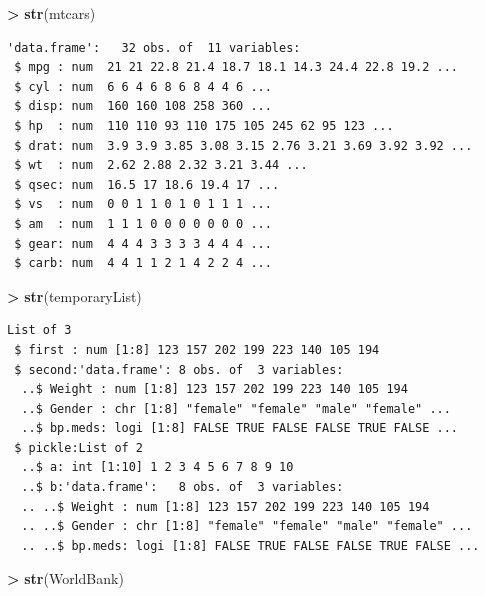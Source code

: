\documentclass[]{krantz}
\makeatletter
\newenvironment{Shaded}{\begin{snugshade}}{\end{snugshade}}
\newcommand{\KeywordTok}[1]{\textcolor[rgb]{0.27,0.27,0.27}{\textbf{#1}}}
\newcommand{\NormalTok}[1]{#1}
\newcommand{\OperatorTok}[1]{\textcolor[rgb]{0.43,0.43,0.43}{\textbf{#1}}}
\newcommand{\StringTok}[1]{\textcolor[rgb]{0.5,0.5,0.5}{#1}}
\newenvironment{kframe}{%
\medskip{}
\setlength{\fboxsep}{.8em}
 \def\at@end@of@kframe{}%
 \ifinner\ifhmode%
  \def\at@end@of@kframe{\end{minipage}}%
  \begin{minipage}{\columnwidth}%
 \fi\fi%
 \def\FrameCommand##1{\hskip\@totalleftmargin \hskip-\fboxsep
 \colorbox{shadecolor}{##1}\hskip-\fboxsep
     \hskip-\linewidth \hskip-\@totalleftmargin \hskip\columnwidth}%
 \MakeFramed {\advance\hsize-\width
   \@totalleftmargin\z@ \linewidth\hsize
   \@setminipage}}%
 {\par\unskip\endMakeFramed%
 \at@end@of@kframe}
\renewenvironment{Shaded}{\begin{kframe}}{\end{kframe}}
\makeatother
\begin{document}
\begin{Shaded}
\begin{Highlighting}[]
\OperatorTok{>}\StringTok{ }\KeywordTok{str}\NormalTok{(mtcars)}
\end{Highlighting}
\end{Shaded}

\begin{verbatim}
'data.frame':   32 obs. of  11 variables:
 $ mpg : num  21 21 22.8 21.4 18.7 18.1 14.3 24.4 22.8 19.2 ...
 $ cyl : num  6 6 4 6 8 6 8 4 4 6 ...
 $ disp: num  160 160 108 258 360 ...
 $ hp  : num  110 110 93 110 175 105 245 62 95 123 ...
 $ drat: num  3.9 3.9 3.85 3.08 3.15 2.76 3.21 3.69 3.92 3.92 ...
 $ wt  : num  2.62 2.88 2.32 3.21 3.44 ...
 $ qsec: num  16.5 17 18.6 19.4 17 ...
 $ vs  : num  0 0 1 1 0 1 0 1 1 1 ...
 $ am  : num  1 1 1 0 0 0 0 0 0 0 ...
 $ gear: num  4 4 4 3 3 3 3 4 4 4 ...
 $ carb: num  4 4 1 1 2 1 4 2 2 4 ...
\end{verbatim}

\begin{Shaded}
\begin{Highlighting}[]
\OperatorTok{>}\StringTok{ }\KeywordTok{str}\NormalTok{(temporaryList)}
\end{Highlighting}
\end{Shaded}

\begin{verbatim}
List of 3
 $ first : num [1:8] 123 157 202 199 223 140 105 194
 $ second:'data.frame': 8 obs. of  3 variables:
  ..$ Weight : num [1:8] 123 157 202 199 223 140 105 194
  ..$ Gender : chr [1:8] "female" "female" "male" "female" ...
  ..$ bp.meds: logi [1:8] FALSE TRUE FALSE FALSE TRUE FALSE ...
 $ pickle:List of 2
  ..$ a: int [1:10] 1 2 3 4 5 6 7 8 9 10
  ..$ b:'data.frame':   8 obs. of  3 variables:
  .. ..$ Weight : num [1:8] 123 157 202 199 223 140 105 194
  .. ..$ Gender : chr [1:8] "female" "female" "male" "female" ...
  .. ..$ bp.meds: logi [1:8] FALSE TRUE FALSE FALSE TRUE FALSE ...
\end{verbatim}

\begin{Shaded}
\begin{Highlighting}[]
\OperatorTok{>}\StringTok{ }\KeywordTok{str}\NormalTok{(WorldBank)}
\end{Highlighting}
\end{Shaded}
\end{document}
